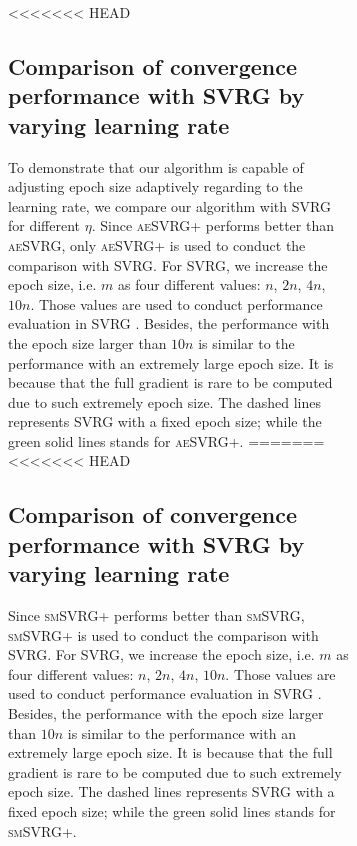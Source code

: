 \documentclass[conference]{IEEEtran}
\begin{document}
\begin{algorithm}[t]
\begin{itemize}
\begin{figure}[ht]
\begin{figure}[ht]
\begin{figure}[ht]
\end{figure}

<<<<<<< HEAD
 \subsection{Comparison of convergence performance with SVRG by varying learning rate}
 To demonstrate that our algorithm is capable of adjusting epoch size adaptively regarding to the learning rate, we compare our algorithm with SVRG for different $\eta$.
Since \textsc{aeSVRG+} performs better than \textsc{aeSVRG}, only \textsc{aeSVRG+} is used to conduct the comparison with SVRG. For SVRG, we increase the epoch size, i.e. $m$ as four different values: $n$, $2n$, $4n$, $10n$. Those values are used to conduct performance evaluation in SVRG \citep{Johnson:9MAvkbgy}.  Besides, the performance with the epoch size larger than $10n$ is similar  to the performance with an extremely large epoch size. It is because that the full gradient is rare to be computed due to such extremely epoch size. The dashed lines represents SVRG with a fixed epoch size; while the green solid lines stands for \textsc{aeSVRG+}.
=======
<<<<<<< HEAD
 \subsection{Comparison of convergence performance with SVRG by varying learning rate}
Since \textsc{smSVRG+} performs better than \textsc{smSVRG}, \textsc{smSVRG+} is used to conduct the comparison with SVRG. For SVRG, we increase the epoch size, i.e. $m$ as four different values: $n$, $2n$, $4n$, $10n$. Those values are used to conduct performance evaluation in SVRG \citep{Johnson:9MAvkbgy}.  Besides, the performance with the epoch size larger than $10n$ is similar  to the performance with an extremely large epoch size. It is because that the full gradient is rare to be computed due to such extremely epoch size. The dashed lines represents SVRG with a fixed epoch size; while the green solid lines stands for \textsc{smSVRG+}.


\end{figure}
\end{figure}
\end{itemize}
\end{algorithm}
\end{document}
